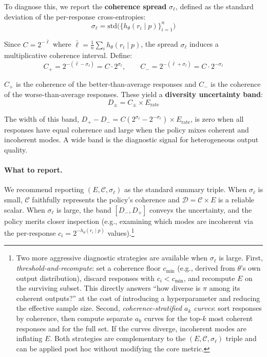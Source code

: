 \documentclass[11pt]{article}
\begin{document}
To diagnose this, we report the \textbf{coherence spread} $\sigma_\ell$, defined as the standard deviation of the per-response cross-entropies:
\begin{equation}
    \sigma_\ell = \mathrm{std}\bigl(\{h_\theta(r_i \mid p)\}_{i=1}^n\bigr)
\end{equation}

Since $C = 2^{-\bar{\ell}}$ where $\bar{\ell} = \frac{1}{n}\sum_i h_\theta(r_i \mid p)$, the spread $\sigma_\ell$ induces a multiplicative coherence interval. Define:
\begin{equation}
    C_+ = 2^{-(\bar{\ell} - \sigma_\ell)} = C \cdot 2^{\sigma_\ell}, \qquad C_- = 2^{-(\bar{\ell} + \sigma_\ell)} = C \cdot 2^{-\sigma_\ell}
\end{equation}

$C_+$ is the coherence of the better-than-average responses and $C_-$ is the coherence of the worse-than-average responses. These yield a \textbf{diversity uncertainty band}:
\begin{equation}
    D_\pm = C_\pm \times E_{\mathrm{rate}}
\end{equation}

The width of this band, $D_+ - D_- = C(2^{\sigma_\ell} - 2^{-\sigma_\ell}) \times E_{\mathrm{rate}}$, is zero when all responses have equal coherence and large when the policy mixes coherent and incoherent modes. A wide band is the diagnostic signal for heterogeneous output quality.

\paragraph{What to report.} We recommend reporting $(E, \mathcal{C}, \sigma_\ell)$ as the standard summary triple. When $\sigma_\ell$ is small, $\mathcal{C}$ faithfully represents the policy's coherence and $\mathcal{D} = \mathcal{C} \times E$ is a reliable scalar. When $\sigma_\ell$ is large, the band $[D_-, D_+]$ conveys the uncertainty, and the policy merits closer inspection (e.g., examining which modes are incoherent via the per-response $c_i = 2^{-h_\theta(r_i \mid p)}$ values).\footnote{Two more aggressive diagnostic strategies are available when $\sigma_\ell$ is large. First, \emph{threshold-and-recompute}: set a coherence floor $c_{\min}$ (e.g., derived from $\theta$'s own output distribution), discard responses with $c_i < c_{\min}$, and recompute $E$ on the surviving subset. This directly answers ``how diverse is $\pi$ among its coherent outputs?'' at the cost of introducing a hyperparameter and reducing the effective sample size. Second, \emph{coherence-stratified $a_k$ curves}: sort responses by coherence, then compute separate $a_k$ curves for the top-$k$ most coherent responses and for the full set. If the curves diverge, incoherent modes are inflating $E$. Both strategies are complementary to the $(E, \mathcal{C}, \sigma_\ell)$ triple and can be applied post hoc without modifying the core metric.}
\end{document}
